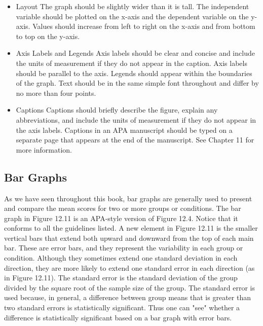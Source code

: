 \begin{itemize}
\item Layout
The graph should be slightly wider than it is tall.
The independent variable should be plotted on the x-axis and the dependent variable on
the y-axis.
Values should increase from left to right on the x-axis and from bottom to top on the y-axis.

\item Axis Labels and Legends
Axis labels should be clear and concise and include the units of measurement if they do not appear in the caption.
Axis labels should be parallel to the axis.
Legends should appear within the boundaries of the graph.
Text should be in the same simple font throughout and differ by no more than four points.

\item Captions
Captions should briefly describe the figure, explain any abbreviations, and include the units of measurement if they do not appear in the axis labels.
Captions in an APA manuscript should be typed on a separate page that appears at the end of the manuscript. See Chapter 11 for more information.
\end{itemize}


\subsection{Bar Graphs}

As we have seen throughout this book, bar graphs are generally used to present and compare the mean scores for two or more groups or conditions. The bar graph in Figure 12.11 is an APA-style version of Figure 12.4. Notice that it conforms to all the guidelines listed. A new element in Figure 12.11 is the smaller vertical bars that extend both upward and downward from the top of each main bar. These are error bars, and they represent the variability in each group or condition. Although they sometimes extend one standard deviation in each direction, they are more likely to extend one standard error in each direction (as in Figure 12.11). The standard error is the standard deviation of the group divided by the square root of the sample size of the group. The standard error is used because, in general, a difference between group means that is greater than two standard errors is statistically significant. Thus one can "see" whether a difference is statistically significant based on a bar graph with error bars.

